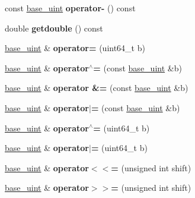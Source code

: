 \begin{DoxyCompactItemize}
const \mbox{\hyperlink{classbase__uint}{base\+\_\+uint}} {\bfseries operator-\/} () const
\item 
\mbox{\label{classbase__uint_ac989d44cd0d60e6c510722a714b817fa}} 
double {\bfseries getdouble} () const
\item 
\mbox{\label{classbase__uint_a115a5ddb2f2637e09703a25cfc580483}} 
\mbox{\hyperlink{classbase__uint}{base\+\_\+uint}} \& {\bfseries operator=} (uint64\+\_\+t b)
\item 
\mbox{\label{classbase__uint_ad5ec10977ebeab115fe857637990e267}} 
\mbox{\hyperlink{classbase__uint}{base\+\_\+uint}} \& {\bfseries operator$^\wedge$=} (const \mbox{\hyperlink{classbase__uint}{base\+\_\+uint}} \&b)
\item 
\mbox{\label{classbase__uint_ae2a17c19cd8f9f6dde651db0e0fc531a}} 
\mbox{\hyperlink{classbase__uint}{base\+\_\+uint}} \& {\bfseries operator \&=} (const \mbox{\hyperlink{classbase__uint}{base\+\_\+uint}} \&b)
\item 
\mbox{\label{classbase__uint_ab116d89cbae68b32fbecf5d1de98bb2e}} 
\mbox{\hyperlink{classbase__uint}{base\+\_\+uint}} \& {\bfseries operator$\vert$=} (const \mbox{\hyperlink{classbase__uint}{base\+\_\+uint}} \&b)
\item 
\mbox{\label{classbase__uint_a3d77324f5c5166e4dabadac360bea6e7}} 
\mbox{\hyperlink{classbase__uint}{base\+\_\+uint}} \& {\bfseries operator$^\wedge$=} (uint64\+\_\+t b)
\item 
\mbox{\label{classbase__uint_ac8edb6e097d9eede21f8fa44e9184913}} 
\mbox{\hyperlink{classbase__uint}{base\+\_\+uint}} \& {\bfseries operator$\vert$=} (uint64\+\_\+t b)
\item 
\mbox{\label{classbase__uint_acb449d2fcb5af767fa6b01890e836a4e}} 
\mbox{\hyperlink{classbase__uint}{base\+\_\+uint}} \& {\bfseries operator$<$$<$=} (unsigned int shift)
\item 
\mbox{\label{classbase__uint_a4e0344432bbcce79525fd2c182173b3b}} 
\mbox{\hyperlink{classbase__uint}{base\+\_\+uint}} \& {\bfseries operator$>$$>$=} (unsigned int shift)

\end{DoxyCompactItemize}
